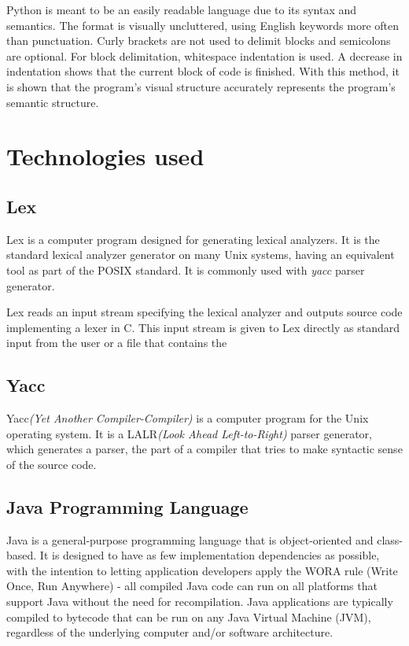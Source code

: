 \documentclass[12pt,a4paper,twoside]{report}
\begin{document}
Python is meant to be an easily readable language due to its syntax and semantics. The format is visually uncluttered, using English keywords more often than punctuation. Curly brackets are not used to delimit blocks and semicolons are optional. For block delimitation, whitespace indentation is used. A decrease in indentation shows that the current block of code is finished. With this method, it is shown that the program's visual structure accurately represents the program's semantic structure. 

\section{Technologies used}

\subsection{Lex}

Lex is a computer program designed for generating lexical analyzers. It is the standard lexical analyzer generator on many Unix systems, having an equivalent tool as part of the POSIX standard. It is commonly used with \textit{yacc} parser generator.

Lex reads an input stream specifying the lexical analyzer and outputs source code implementing a lexer in C. This input stream is given to Lex directly as standard input from the user or a file that contains the 

\subsection{Yacc}

Yacc\textit{(Yet Another Compiler-Compiler)} is a computer program for the Unix operating system. It is a LALR\textit{(Look Ahead Left-to-Right)} parser generator, which generates a parser, the part of a compiler that tries to make syntactic sense of the source code. 

\subsection{Java Programming Language}
Java is a general-purpose programming language that is object-oriented and class-based. It is designed to have as few implementation dependencies as possible, with the intention to letting application developers apply the WORA rule (Write Once, Run Anywhere) - all compiled Java code can run on all platforms that support Java without the need for recompilation. 
Java applications are typically compiled to bytecode that can be run on any Java Virtual Machine (JVM), regardless of the underlying computer and/or software architecture. 
\end{document}
